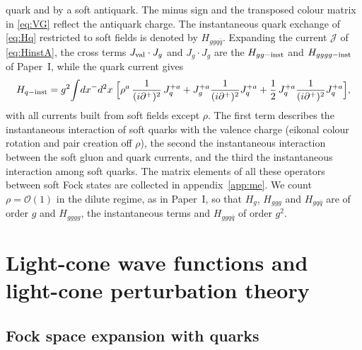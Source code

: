 \documentclass[11pt,a4paper]{article}
\numberwithin{equation}{section}
\newcommand{\Jc}{\mathcal{J}}
\newcommand{\order}[1]{\mathcal{O}(#1)}
\begin{document}
quark and by a soft antiquark. The minus sign and the transposed colour matrix in \eqref{eq:VG}
reflect the antiquark charge. The instantaneous quark exchange of \eqref{eq:Hq} restricted to soft
fields is denoted by $H_{ggq\bar q}$. Expanding the current $\Jc$ of \eqref{eq:HinstA}, the
cross terms $J_{\rm val}\cdot J_{g}$ and $J_{g}\cdot J_{g}$ are the $H_{gg-{\rm inst}}$ and
$H_{gggg-{\rm inst}}$ of Paper~I, while the quark current gives
\begin{equation}
H_{q-{\rm inst}}=g^{2}\!\int\!dx^{-}d^{2}x\;\Big[\rho^{a}\,\frac{1}{(i\partial^{+})^{2}}\,J^{+a}_{q}
+J^{+a}_{g}\frac{1}{(i\partial^{+})^{2}}J^{+a}_{q}
+\frac12\,J^{+a}_{q}\frac{1}{(i\partial^{+})^{2}}J^{+a}_{q}\Big],
\label{eq:Hqinst}
\end{equation}
with all currents built from soft fields except $\rho$. The first term describes the
instantaneous interaction of soft quarks with the valence charge (eikonal colour rotation and
pair creation off $\rho$), the second the instantaneous interaction between the soft gluon and
quark currents, and the third the instantaneous interaction among soft quarks. The matrix
elements of all these operators between soft Fock states are collected in
appendix~\ref{app:me}. We count $\rho=\order{1}$ in the dilute regime, as in Paper~I, so that
$H_{g}$, $H_{ggg}$ and $H_{gq\bar q}$ are of order $g$ and $H_{gggg}$, the instantaneous terms and
$H_{ggq\bar q}$ of order $g^{2}$.

\section{Light-cone wave functions and light-cone perturbation theory}
\label{sec:lcwf}

\subsection{Fock space expansion with quarks}
\label{sec:fock}
\end{document}
